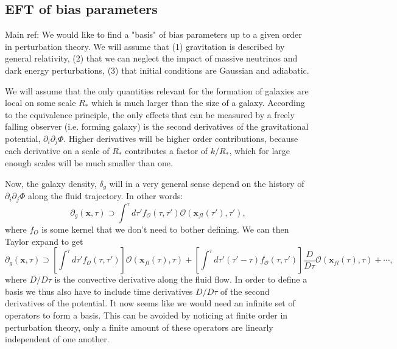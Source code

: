 \documentclass[11pt]{article}
\newcommand{\sbr}[1]{\ensuremath{\left[ #1 \right]}}
\begin{document}
\subsection{EFT of bias parameters}
Main ref: \cite{Desjacques_2018}
We would like to find a "basis" of bias parameters up to a given order in perturbation theory. We will assume that (1) gravitation is described by general relativity, (2) that we can neglect the impact of massive neutrinos and dark energy perturbations, (3) that initial conditions are Gaussian and adiabatic.

We will assume that the only quantities relevant for the formation of galaxies are local on some scale $R_*$ which is much larger than the size of a galaxy. According to the equivalence principle, the only effects that can be measured by a freely falling observer (i.e. forming galaxy) is the second derivatives of the gravitational potential, $\partial_i \partial_j \Phi$. Higher derivatives will be higher order contributions, because each derivative on a scale of $R_*$ contributes a factor of $k/R_*$, which for large enough scales will be much smaller than one.

Now, the galaxy density, $\delta_g$ %
will in a very general sense depend on the history of $\partial_i \partial_j \Phi$ along the fluid trajectory. In other words:
\begin{equation}
    \partial_g(\mathbf x, \tau) \supset \int^\tau d\tau'f_{\mathcal O }(\tau, \tau') \mathcal O (\mathbf x_{fl}(\tau'), \tau'),
\end{equation}
where $f_O$ is some kernel that we don't need to bother defining. %
We can then Taylor expand to get
\begin{equation}
    \partial_g(\mathbf x, \tau) \supset \sbr{\int^\tau d\tau'f_{\mathcal O }(\tau, \tau')} \mathcal O (\mathbf x_{fl}(\tau), \tau) + \sbr{\int^\tau d\tau' (\tau'-\tau) f_{\mathcal O }(\tau, \tau')} \frac{D}{D\tau}\mathcal O (\mathbf x_{fl}(\tau), \tau) + \cdots,
\end{equation}
where $D/D\tau$ is the convective derivative along the fluid flow. %
In order to define a basis we thus also have to include time derivatives $D/D\tau$ of the second derivatives of the potential. It now seems like we would need an infinite set of operators to form a basis. This can be avoided by noticing at finite order in perturbation theory, only a finite amount of these operators are linearly independent of one another.
\end{document}
